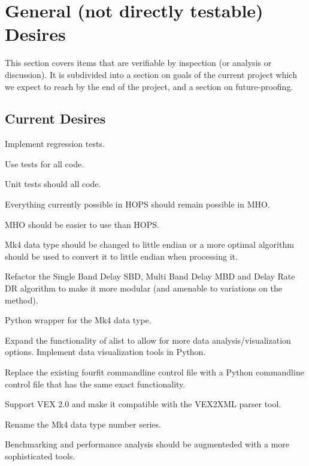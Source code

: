 \section{General (not directly testable) Desires}
\label{sec:desires}

This section covers items that are verifiable by inspection (or analysis
or discussion).  It is subdivided into a section on goals of the current
project which we expect to reach by the end of the project, and a section
on future-proofing.

\subsection{Current Desires}
\label{sec:currentdesires}

\begin{description}
 Implement regression tests. \FIXME[enumerate]

 Use  tests for all code. \FIXME[enumerate]

 Unit tests should  all code. \FIXME[enumerate]

 Everything currently possible in \ac{HOPS} should remain
    possible in \ac{MHO}.

 \ac{MHO} should be easier to use than \ac{HOPS}.

 Mk4 data type should be changed to little endian or a more
    optimal algorithm should be used to convert it to little endian
    when processing it.

 Refactor the Single Band Delay \ac{SBD},
    Multi Band Delay \ac{MBD} and Delay Rate \ac{DR} algorithm to
    make it more modular (and amenable to variations on the method).

 Python wrapper for the Mk4 data type.

 Expand the functionality of alist to allow for more data
    analysis/visualization options.
 Implement data visualization tools in Python.

 Replace the existing fourfit commandline control file with
    a Python commandline control file that has the same exact functionality.

 Support VEX 2.0 and make it compatible with the VEX2XML parser tool.

 Rename the Mk4 data type number series.

 Benchmarking and performance analysis should be augmenteded
    with a more sophisticated tools.


\end{description}
